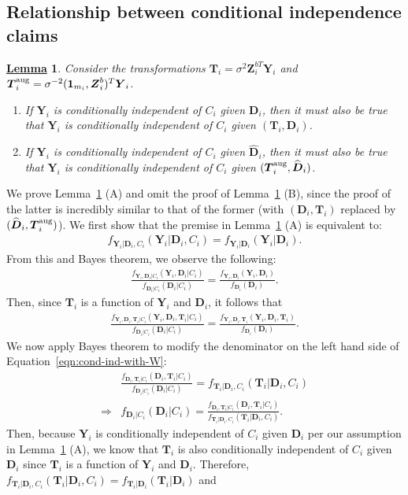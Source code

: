 \documentclass[12pt]{article}
\def\bse{\begin{eqnarray*}}
\def\ese{\end{eqnarray*}}
\def\be{\begin{eqnarray}}
\def\ee{\end{eqnarray}}
\def\bse{\begin{eqnarray*}}
\def\ese{\end{eqnarray*}}
\def\bone{{\boldsymbol{1}}}
\def\bD{{\boldsymbol D}}
\def\bT{{\boldsymbol T}}
\def\bY{{\boldsymbol Y}}
\def\bZ{{\boldsymbol Z}}
\def\tilD{\bD}
\newtheorem{Lem}{\underline{\bf Lemma}}
\begin{document}
\subsection{Relationship between conditional independence claims}
\label{sec:cond-ind-relationship}
\begin{Lem}
\label{lem:cond_ind_claims}
Consider the transformations $\bT_i=\sigma^2\bZ_i^{bT}\bY_i$ and $\bT_i^{\rm aug}=\sigma^{-2}(\bone_{m_i},\bZ^b_i)^T\bY_i$.
\begin{enumerate}
    \item[(A)] If $\bY_i$ is conditionally independent of $C_i$ given $\tilD_i$, then it must also be true that $\bY_i$ is conditionally independent of $C_i$ given $(\bT_i, \tilD_i)$.
    \item[(B)] If $\bY_i$ is conditionally independent of $C_i$ given $\widehat{\tilD}_i$, then it must also be true that $\bY_i$ is conditionally independent of $C_i$ given $(\bT_i^{\rm aug}, \widehat{\tilD}_i)$.
\end{enumerate}
\end{Lem}
We prove Lemma~\ref{lem:cond_ind_claims} (A) and omit the proof of Lemma~\ref{lem:cond_ind_claims} (B), since the proof of the latter is incredibly similar to that of the former (with $(\tilD_i, \bT_i)$ replaced by $(\widehat{\tilD}_i, \bT_i^{\rm aug})$). We first show that the premise in Lemma~\ref{lem:cond_ind_claims} (A) is equivalent to:
\bse
f_{\bY_i| \tilD_i, C_i}(\bY_i|\tilD_i,C_i) = f_{\bY_i| \tilD_i}(\bY_i|\tilD_i).
\ese
From this and Bayes theorem, we observe the following:
\bse
\frac{f_{\bY_i, \tilD_i| C_i}(\bY_i,\tilD_i|C_i)}{f_{\tilD_i| C_i}(\tilD_i|C_i)} = \frac{f_{\bY_i, \tilD_i}(\bY_i,\tilD_i)}{f_{ \tilD_i}(\tilD_i)}.
\ese
Then, since $\bT_i$ is a function of $\bY_i$ and $\tilD_i$, it follows that
\be
\label{eqn:cond-ind-with-W}
\frac{f_{\bY_i, \tilD_i, \bT_i| C_i}(\bY_i,\tilD_i, \bT_i|C_i)}{f_{\tilD_i| C_i}(\tilD_i|C_i)} = \frac{f_{\bY_i, \tilD_i, \bT_i}(\bY_i,\tilD_i,\bT_i)}{f_{ \tilD_i}(\tilD_i)}.
\ee
We now apply Bayes theorem to modify the denominator on the left hand side of Equation~\eqref{eqn:cond-ind-with-W}:
\bse
&\frac{f_{\tilD_i,\bT_i|C_i}(\tilD_i,\bT_i|C_i)}{f_{ \tilD_i|C_i}(\tilD_i|C_i)}=f_{\bT_i|\tilD_i,C_i}(\bT_i|\tilD_i,C_i) \\
\Rightarrow& f_{ \tilD_i|C_i}(\tilD_i|C_i)=\frac{f_{\tilD_i,\bT_i|C_i}(\tilD_i,\bT_i|C_i)}{f_{\bT_i|\tilD_i,C_i}(\bT_i|\tilD_i,C_i)}.
\ese
Then, because $\bY_i$ is conditionally independent of $C_i$ given $\tilD_i$ per our assumption in Lemma~\ref{lem:cond_ind_claims} (A), we know that $\bT_i$ is also conditionally independent of $C_i$ given $\tilD_i$ since $\bT_i$ is a function of $\bY_i$ and $\tilD_i$. Therefore, $f_{\bT_i|\tilD_i,C_i}(\bT_i|\tilD_i,C_i)=f_{\bT_i|\tilD_i}(\bT_i|\tilD_i)$ and
\end{document}
